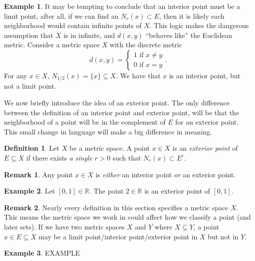 \documentclass{article}
\newcommand{\R}{\mathbb{R}}
\theoremstyle{definition}
\newtheorem{definition}{Definition}[section]
\newtheorem{example}{Example}[section]
\newtheorem{remark}{Remark}[section]
\begin{document}
\begin{example}
	It may be tempting to conclude that an interior point must be a limit point, after all, if we can find an $ N_r(x)\subset E $, then it is likely each neighborhood would contain infinite points of $ X $. This logic makes the dangerous assumption that $ X $ is in infinite, and $ d(x,y) $ ``behaves like'' the Euclidean metric. Consider a metric space $ X $ with the discrete metric $$ d(x,y)=\begin{cases}
	1\text{ if }x\neq y\\
	0\text{ if }x=y
	\end{cases}.$$ 
	For any $ x\in X $, $ N_{1/2}(x)=\{x\}\subseteq X $. We have that $ x $ is an interior point, but not a limit point. 
\end{example}
We now briefly introduce the idea of an exterior point. The only difference between the  definition of an interior point and exterior point, will be that the neighborhood of a point will be in the complement of $ E $ for an exterior point. This small change in language will make a big difference in meaning. 
\begin{definition}
Let $ X $ be a metric space. A point $ x\in X$ is an \textit{\color{red}exterior point} of $ E\subseteq X $ if there exists \textit{a single} $ r>0 $ such that $ N_r(x)\subset E^c $.
\end{definition}
\begin{remark}
Any point $ x\in X $ is \textit{either} an interior point \textit{or} an exterior point.
\end{remark}
\begin{example}
	Let $ [0,1]\in \R $. The point $ 2\in\R $ is an exterior point of $ [0,1] $. 
\end{example} 
\begin{remark}
	Nearly every definition in this section specifies a metric space $ X $. This means the metric space we work in could affect how we classify a point (and later sets). If we have two metric spaces $ X $ and $ Y $ where $ X\subseteq Y $, a point $ x\in E\subseteq X $ may be a limit point/interior point/exterior point in $ X $ but not in $ Y $. 
\end{remark}
\begin{example}
{\color{red}EXAMPLE }
\end{example}
\end{document}
